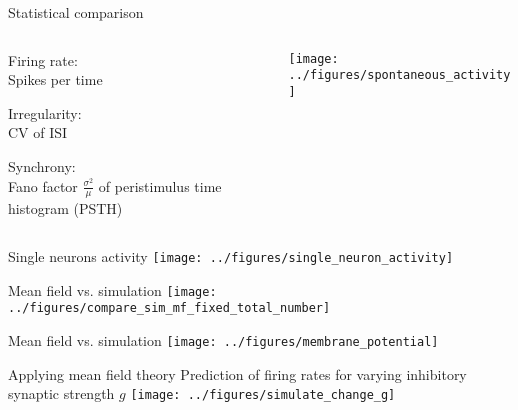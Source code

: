 \documentclass[xcolor=x11names,compress]{beamer}
\renewcommand{\(}{\begin{columns}}
\renewcommand{\)}{\end{columns}}
\newcommand{\<}[1]{\begin{column}{#1}}
\renewcommand{\>}{\end{column}}
\begin{document}
\begin{frame}[t]{Statistical comparison}
    \begin{columns}[T] %
    \begin{column}[T]{4cm} %
        \begin{block}{%
        Firing rate: \\ Spikes per time
            }
        \end{block}
        \vfill
        \begin{block}{%
        Irregularity: \\ CV of ISI 
            }
        \end{block}
        \vfill
        \begin{block}{%
        Synchrony: \\ 
        Fano factor $\frac{\sigma^2}{\mu}$ of peristimulus time histogram (PSTH)
            }
        \end{block}
    \end{column}
    \begin{column}[T]{6cm} %
        \center
        \texttt{[image: ../figures/spontaneous\_activity]}
    \end{column}
    \end{columns}
\end{frame}

\begin{frame}[t]{Single neurons activity}
    \center
    \texttt{[image: ../figures/single\_neuron\_activity]}
\end{frame}

\begin{frame}[t]{Mean field vs. simulation}
    \center
    \texttt{[image: ../figures/compare\_sim\_mf\_fixed\_total\_number]}
\end{frame}

\begin{frame}[t]{Mean field vs. simulation}
    \center
    \texttt{[image: ../figures/membrane\_potential]}
\end{frame}

\begin{frame}[t]{Applying mean field theory}
    Prediction of firing rates for varying inhibitory synaptic strength $g$
    \center
    \texttt{[image: ../figures/simulate\_change\_g]}
\end{frame}
\end{document}
